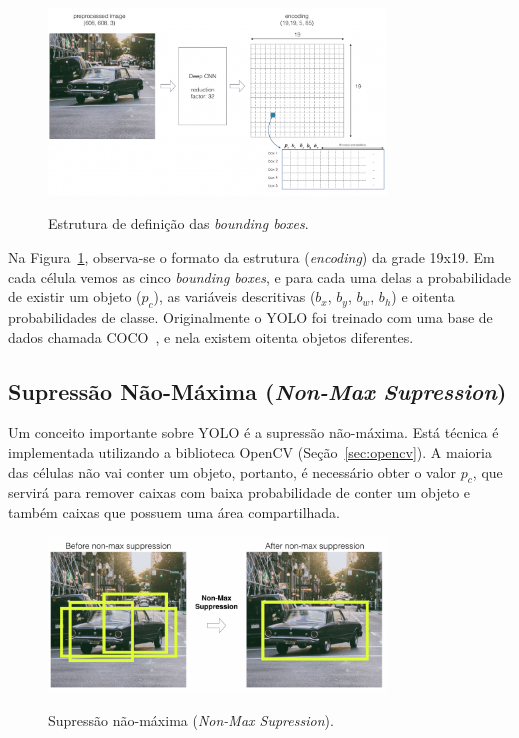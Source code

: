 \begin{figure}[!hbtp]
  \centering
   \caption{Estrutura de definição das \textit{bounding boxes}.}
    \includegraphics[width = 0.8\textwidth]{Caps/Figs/mat-met/bbox-2.png}
   \label{fig:bbox2}
\end{figure}

Na Figura~\ref{fig:bbox2}, observa-se o formato da estrutura (\textit{encoding}) da grade 19x19. Em cada célula vemos as cinco \textit{bounding boxes}, e para cada uma delas a probabilidade de existir um objeto ($p_c$), as variáveis descritivas ($b_x$, $b_y$, $b_w$, $b_h$) e oitenta probabilidades de classe. Originalmente o YOLO foi treinado com uma base de dados chamada COCO~\cite{lin2014microsoft}, e nela existem oitenta objetos diferentes.

\subsection{Supressão Não-Máxima (\textit{Non-Max Supression})}
\label{subsec:nonmax-supression}

Um conceito importante sobre YOLO é a supressão não-máxima. Está técnica é implementada utilizando a biblioteca OpenCV (Seção~\ref{sec:opencv}). A maioria das células não vai conter um objeto, portanto, é necessário obter o valor $p_c$, que servirá para remover caixas com baixa probabilidade de conter um objeto e também caixas que possuem uma área compartilhada.

\begin{figure}[!hbtp]
  \centering
   \caption{Supressão não-máxima (\textit{Non-Max Supression}).}
    \includegraphics[width = 0.8\textwidth]{Caps/Figs/mat-met/nonmax-1-1024x472.png}
   \label{fig:nonmax-supression}
\end{figure}

